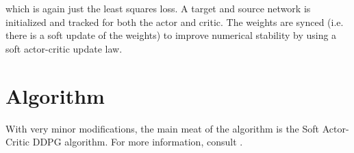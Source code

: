 \documentclass[11pt]{article}
\begin{document}
which is again just the least squares loss. A target and source network is initialized and tracked for both the actor and critic. The weights are synced (i.e. there is a soft update of the weights) to improve numerical stability by using a soft actor-critic update law. 

\section{Algorithm}
With very minor modifications, the main meat of the algorithm is the Soft Actor-Critic DDPG algorithm. For more information, consult \cite{deep}.
\end{document}
